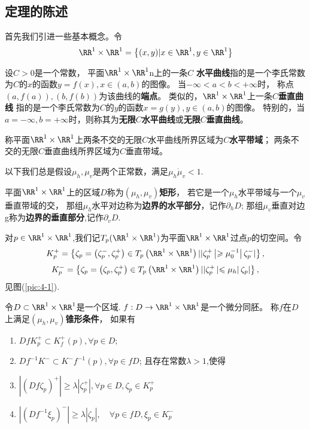 \subsection{定理的陈述}
首先我们引进一些基本概念。令
$$
\RR^{1} \times \RR^{1}=\left\{(x, y) | x \in \RR^{1}, y \in \RR^{1}\right\}
$$
\begin{defination}
  设$C>0$是一个常数，
  平面$\RR^1 \times \RR^1$n上的一条$C$ \textbf{水平曲线}指的是一个李氏常数为$C$的$x$的函数$y=f(x),x\in (a,b)$的图像。
  当$-\infty<a<b<+\infty$时，
  称点$(a,f(a)),(b,f(b))$为该曲线的\textbf{端点}。
  类似的，$\RR^1\times \RR^1$上一条$C$\textbf{垂直曲线} 指的是一个李氏常数为$C$的$y$的函数$x=g(y),y\in (a,b)$的图像。
  特别的，当$a=-\infty,b=+\infty$时，则称其为\textbf{无限$C$水平曲线}或\textbf{无限$C$垂直曲线}。
\end{defination}
\begin{defination}
  称平面$\RR^1\times \RR^1$上两条不交的无限$C$水平曲线所界区域为$C$\textbf{水平带域}；
两条不交的无限$C$垂直曲线所界区域为$C$垂直带域。
\end{defination}
\par
以下我们总是假设$\mu_h,\mu_v$是两个正常数，满足$\mu_h\dot \mu_v <1$.
\begin{defination}
  平面$\RR^1 \times \RR^1$上的区域$D$称为$(\mu_h,\mu_v)$\textbf{矩形}，
  若它是一个$\mu_h$水平带域与一个$\mu_v$垂直带域的交，
  那组$\mu_h$水平对边称为\textbf{边界的水平部分}，记作$\partial_hD$;
  那组$\mu_v$垂直对边g称为\textbf{边界的垂直部分},记作$\partial_vD$.
\end{defination}
\par
对$p \in \RR^1\times\RR^1$,我们记$T_p(\RR^1\times\RR^1)$为平面$\RR^1\times\RR^1$过点$p$的切空间。令
$$K_{p}^{+}=\left\{\zeta_{p}=\left(\zeta_{p}^{-}, \zeta_{p}^{+}\right) \in T_{p}\left(\RR^{1} \times \RR^{1}\right)| | \zeta_{p}^{+}\left|\geqslant \mu_{0}^{-1}\right| \zeta_{p}^{-} |\right\},$$
$$K_{p}^{-}=\left\{\zeta_{p}=\left(\zeta_{p}, \zeta_{p}^{+}\right) \in T_{p}\left(\RR^{1} \times \RR^{1}\right)| | \zeta_{p}^{+}\left| \leqslant \mu_{h}\right| \zeta_{p} |\right\},$$
见图(\ref{pic:4-1}).
\begin{defination}
  令$D\subset\RR^1\times\RR^1$是一个区域.
  $f:D\to\RR^1\times\RR^1$是一个微分同胚。
  称$f$在$D$上满足$(\mu_h,\mu_v)$\textbf{锥形条件}，
  如果有
  \begin{enumerate}
  \item $Df K_p^+ \subset K^+_f(p),\forall p \in D$;
  \item $Df^{-1}K^- \subset K^-f^{-1}(p),\forall p \in fD$;
    且存在常数$\lambda >1$,使得
  \item
$ {\left|\left(D f \zeta_{p}\right)^{+}\right| \geqslant \lambda\left|\zeta_{p}^{+}\right|} ,{\forall p \in D, \zeta_{p} \in K_{p}^{+}}$
\item $\left|\left(D f^{-1} \xi_{p}\right)^{-}\right| \geqslant \lambda\left|\zeta_{p}\right|, \quad \forall p \in f D, \xi_{p} \in K_{p}^{-}$
  \end{enumerate}
\end{defination}


